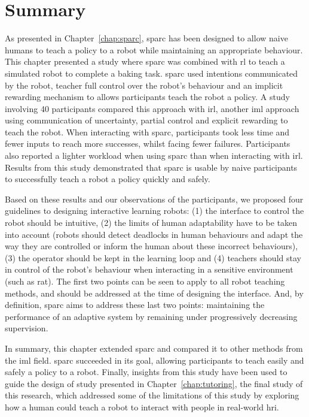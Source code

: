 \section{Summary}

As presented in Chapter~\ref{chap:sparc}, \gls{sparc} has been designed to allow naive humans to teach a policy to a robot while maintaining an appropriate behaviour. This chapter presented a study where \gls{sparc} was combined with \gls{rl} to teach a simulated robot to complete a baking task. \gls{sparc} used intentions communicated by the robot, teacher full control over the robot's behaviour and an implicit rewarding mechanism to allows participants teach the robot a policy. A study involving 40 participants compared this approach with \gls{irl}, another \gls{iml} approach using communication of uncertainty, partial control and explicit rewarding to teach the robot. When interacting with \gls{sparc}, participants took less time and fewer inputs to reach more successes, whilst facing fewer failures. Participants also reported a lighter workload when using \gls{sparc} than when interacting with \gls{irl}. Results from this study demonstrated that \gls{sparc} is usable by naive participants to successfully teach a robot a policy quickly and safely.

Based on these results and our observations of the participants, we proposed four guidelines to designing interactive learning robots: (1) the interface to control the robot should be intuitive, (2) the limits of human adaptability have to be taken into account (robots should detect deadlocks in human behaviours and adapt the way they are controlled or inform the human about these incorrect behaviours), (3) the operator should be kept in the learning loop and (4) teachers should stay in control of the robot's behaviour when interacting in a sensitive environment (such as \acrlong{rat}). The first two points can be seen to apply to all robot teaching methods, and should be addressed at the time of designing the interface. And, by definition, \gls{sparc} aims to address these last two points: maintaining the performance of an adaptive system by remaining under progressively decreasing supervision.

In summary, this chapter extended \gls{sparc} and compared it to other methods from the \gls{iml} field. \gls{sparc} succeeded in its goal, allowing participants to teach easily and safely a policy to a robot. Finally, insights from this study have been used to guide the design of study presented in Chapter~\ref{chap:tutoring}, the final study of this research, which addressed some of the limitations of this study by exploring how a human could teach a robot to interact with people in real-world \gls{hri}.


